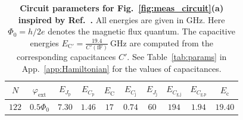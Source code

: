 \documentclass[%
reprint,
superscriptaddress,
 amsmath,amssymb,
 aps,
 prx,
longbibliography,
floatfix,
]{revtex4-2}
\begin{document}
\renewcommand{\arraystretch}{1.5} %
\begin{table}[htb]
\centering
\begin{tabular}{|c|c|c|c|c|c|c|c|c|c|}
    \hline
     $N$ & $\varphi_{\textrm{ext}}$ & $E_{J_\textrm{p}}$ & $E_{C_\textrm{p}}$ & $E_{\textrm{C}}$ & $E_{C_\textrm{j}}$ & $E_{J_\textrm{j}}$ & $E_{C_\textrm{g,j}}$ & $E_{C_\textrm{g,p}}$ & $E_{\textrm{c}}$ \\
    \hline
    $122$ & $0.5\Phi_0$ & $7.30$ & $1.46$ & $17$ & $0.74$ & $60$ & $194$ & $1.94$ & $19.40$ \\
    \hline
\end{tabular}
\caption{{\bf Circuit parameters for Fig.~\ref{fig:meas_circuit}(a) inspired by Ref.~\cite{zhang_universal_2021}.} All energies are given in GHz. Here $\Phi_0=h/2e$ denotes the magnetic flux quantum. The capacitive energies $E_{\textrm{C}'}=\frac{19.4}{{C'}(\mathrm{fF})} \ \mathrm{GHz}$ are computed from the corresponding capacitances $C'$. See Table~\ref{tab:params} in App.~\ref{app:Hamiltonian} for the values of capacitances.}
\label{tab:circuit_params}
\end{table}







\renewcommand{\arraystretch}{1.5} %
\end{document}
